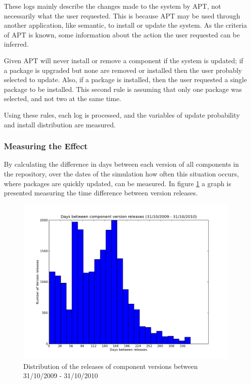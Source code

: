 These logs mainly describe the changes made to the system by APT, not necessarily what the user requested.
This is because APT may be used through another application, like semantic, to install or update the system.
As the criteria of APT is known, some information about the action the user requested can be inferred.

Given APT will never install or remove a component if the system is updated; 
if a package is upgraded but none are removed or installed then the user probably selected to update.
Also, if a package is installed, then the user requested a single package to be installed.
This second rule is assuming that only one package was selected, and not two at the same time.

Using these rules, each log is processed, and the variables of update probability and install distribution are measured.


\subsubsection{Measuring the Effect}
By calculating the difference in days between each version of all components in the repository, 
over the dates of the simulation how often this situation occurs, where packages are quickly updated, can be measured.
In figure \ref{comeponentversionreleases} a graph is presented measuring the time difference between version releases.
 
\begin{figure}[htp]
\begin{center}
  \includegraphics[width=\textwidth]{ubuntusimulationpics/versionreleasedistribution}
  \caption[labelInTOC]{Distribution of the releases of component versions between 31/10/2009 - 31/10/2010}
  \label{comeponentversionreleases}
\end{center}
\end{figure}

